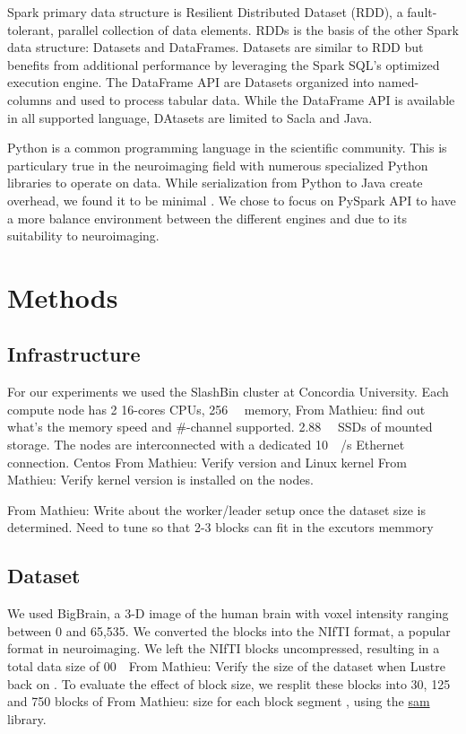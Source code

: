 \documentclass[conference]{IEEEtran}
\newcommand{\MD}[1]{\color{magenta}From Mathieu: #1 \color{black}}
\begin{document}
Spark primary data structure is Resilient Distributed Dataset (RDD)\cite{RDD}, a fault-tolerant, parallel collection of data elements.
RDDs is the basis of the other Spark data structure: Datasets and DataFrames.
Datasets are similar to RDD but benefits from additional performance by leveraging the Spark SQL's optimized execution engine.
The DataFrame API are Datasets organized into named-columns and used to process tabular data.
While the DataFrame API is available in all supported language, DAtasets are limited to Sacla and Java.

Python is a common programming language in the scientific community.
This is particulary true in the neuroimaging field with numerous specialized Python libraries to operate on data.
While serialization from Python to Java create overhead, we found it to be minimal \cite{8943502}.
We chose to focus on PySpark API to have a more balance environment between the different engines and due to its suitability to neuroimaging.

\section{Methods}
\subsection{Infrastructure}
For our experiments we used the SlashBin cluster at Concordia University.
Each compute node has 2 16-cores CPUs,
\SI{256}{\giga\byte} memory, \MD{find out what's the memory speed and \#-channel supported.}
\SI{2.88}{\tera\byte} SSDs of mounted storage.
The nodes are interconnected with a dedicated \SI{10}{\giga\bit/\second} Ethernet connection.
Centos \MD{Verify version} and Linux kernel \MD{Verify kernel version} is installed on the nodes.

\MD{Write about the worker/leader setup once the dataset size is determined. Need to tune so that 2-3 blocks can fit in the excutors memmory}


\subsection{Dataset}
We used BigBrain\cite{Amunts:13}, a 3-D image of the human brain with voxel intensity ranging between 0 and 65,535.
We converted the blocks into the NIfTI format, a popular format in neuroimaging.
We left the NIfTI blocks uncompressed, resulting in a total data size of \SI{00}{\giga\byte}\MD{Verify the size of the dataset when Lustre back on}.
To evaluate the effect of block size, we resplit these blocks into 30, 125 and 750 blocks of \MD{size for each block segment}, using the \href{https://github.com/big-data-lab-team/sam}{sam} library.
	
\end{document}
